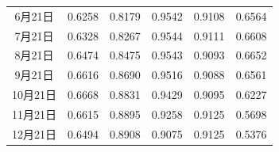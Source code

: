 \documentclass[withoutpreface,bwprint]{cumcmthesis}
\begin{document}
\begin{table}[!htbp]
\begin{tabular}{cccccc}
					6月21日  & 0.6258                                            & 0.8179                                            & 0.9542                                              & 0.9108                                            & 0.6564                                                          \\
					7月21日  & 0.6328                                            & 0.8267                                            & 0.9544                                              & 0.9111                                            & 0.6608                                                          \\
					8月21日  & 0.6474                                            & 0.8475                                            & 0.9543                                              & 0.9093                                            & 0.6652                                                          \\
					9月21日  & 0.6616                                            & 0.8690                                            & 0.9516                                              & 0.9088                                            & 0.6561                                                          \\
					10月21日 & 0.6668                                            & 0.8831                                            & 0.9429                                              & 0.9095                                            & 0.6227                                                          \\
					11月21日 & 0.6615                                            & 0.8895                                            & 0.9258                                              & 0.9125                                            & 0.5698                                                          \\
					12月21日 & 0.6494                                            & 0.8908                                            & 0.9075                                              & 0.9125                                            & 0.5376                                                          \\ \hline
				\end{tabular}
			\end{table}
				
\end{document}
